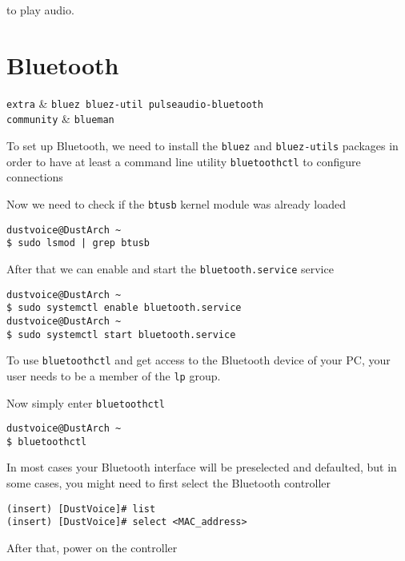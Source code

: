 \documentclass[10pt]{dustdoc}
\begin{document}
\noindent
to play audio.

\section{Bluetooth}
\label{sec:bluetooth}

\begin{packagetable}
    \texttt{extra} & \texttt{bluez bluez-util pulseaudio-bluetooth} \\
    \texttt{community} & \texttt{blueman} \\
\end{packagetable}

To set up Bluetooth, we need to install the \texttt{bluez} and \texttt{bluez-utils} packages in order to have at least a command line utility \texttt{bluetoothctl} to configure connections

Now we need to check if the \texttt{btusb} kernel module was already loaded

\begin{verbatim}
dustvoice@DustArch ~
$ sudo lsmod | grep btusb
\end{verbatim}

After that we can enable and start the \texttt{bluetooth.service} service

\begin{verbatim}
dustvoice@DustArch ~
$ sudo systemctl enable bluetooth.service
dustvoice@DustArch ~
$ sudo systemctl start bluetooth.service
\end{verbatim}

\begin{NOTE}
    To use \texttt{bluetoothctl} and get access to the Bluetooth device of your PC, your user needs to be a member of the \texttt{lp} group.
\end{NOTE}

Now simply enter \texttt{bluetoothctl}

\begin{verbatim}
dustvoice@DustArch ~
$ bluetoothctl
\end{verbatim}

In most cases your Bluetooth interface will be preselected and defaulted, but in some cases, you might need to first select the Bluetooth controller

\begin{verbatim}
(insert) [DustVoice]# list
(insert) [DustVoice]# select <MAC_address>
\end{verbatim}

After that, power on the controller
\end{document}
